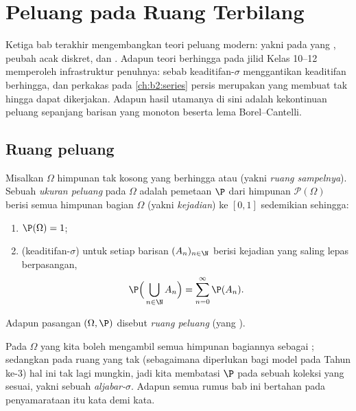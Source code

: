 \chapter{Peluang pada Ruang Terbilang}\label{ch:b2:proba}

Ketiga bab terakhir mengembangkan teori peluang modern: yakni
 pada  yang ,
peubah acak diskret, dan . Adapun
teori berhingga pada jilid Kelas 10--12 memperoleh
infrastruktur penuhnya: sebab keaditifan-$\sigma$ menggantikan keaditifan berhingga,
dan perkakas  pada \cref{ch:b2:series}
persis merupakan yang membuat  tak hingga dapat dikerjakan. Adapun
hasil utamanya di sini adalah kekontinuan peluang sepanjang
barisan  yang monoton beserta lema Borel--Cantelli.

\section{Ruang peluang}

\begin{definition}\label{def:b2:proba:space}
Misalkan $\Omega$ himpunan tak kosong yang berhingga atau  (yakni
\emph{ruang sampelnya}). Sebuah \emph{ukuran
peluang} pada $\Omega$ adalah
pemetaan $\P$ dari himpunan $\mathcal{P}(\Omega)$ berisi semua himpunan bagian
$\Omega$ (yakni \emph{kejadian}) ke $[0, 1]$ sedemikian sehingga:
\begin{enumerate}
\item $\P(\Omega) = 1$;
\item (keaditifan-$\sigma$) untuk setiap barisan $(A_n)_{n\in\N}$ berisi
kejadian yang saling lepas berpasangan,
\[
\P\Bigl(\,\bigcup_{n \in \N} A_n\Bigr)
= \sum_{n=0}^{\infty} \P(A_n) .
\]
\end{enumerate}
Adapun pasangan $(\Omega, \P)$ disebut \emph{ruang peluang} (yang ).
\end{definition}

\begin{remark}
Pada $\Omega$ yang  kita boleh mengambil semua himpunan bagiannya sebagai ; sedangkan pada
ruang yang tak  (sebagaimana diperlukan bagi model  pada Tahun ke-3)
hal ini tak lagi mungkin, jadi kita membatasi $\P$ pada sebuah
koleksi  yang sesuai, yakni sebuah \emph{aljabar-$\sigma$}. Adapun semua rumus
bab ini bertahan pada penyamarataan itu kata demi kata.
\end{remark}

